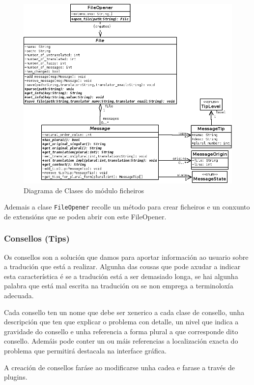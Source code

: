 \begin{figure}[h!]
    \centering
    \includegraphics[width=\textwidth]{img/genericfile.png}
    \caption{Diagrama de Clases do módulo ficheiros}
    \label{fig:dia_class:files}
\end{figure}

Ademais a clase \lstinline{FileOpener} recolle un método para crear ficheiros e un conxunto de extensións que se poden abrir con este FileOpener.

\subsubsection{Consellos (Tips)}
Os consellos son a solución que damos para aportar información ao usuario sobre a tradución que está a realizar. Algunha das cousas que pode axudar a indicar esta característica é se a tradución está a ser demasiado longa, se hai algunha palabra que está mal escrita na tradución ou se non emprega a terminoloxía adecuada.

Cada consello ten un nome que debe ser xenerico a cada clase de consello, unha descripción que ten que explicar o problema con detalle, un nivel que indica a gravidade do consello e unha referencia a forma plural a que corresponde dito consello. Ademáis pode conter un ou máis referencias a localización exacta do problema que permitirá destacala na interface gráfica.

A creación de consellos faráse ao modificarse unha cadea e farase a través de plugins.

